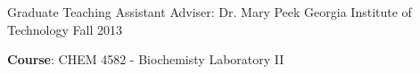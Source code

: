 \begin{cventries}
  \cventry
    {Graduate Teaching Assistant} %
    {Adviser: Dr. Mary Peek} %
    {Georgia Institute of Technology} %
    {Fall 2013} %
    {
      \begin{cvitems} %
        \item {\textbf{Course}: CHEM 4582 - Biochemisty Laboratory II}
      \end{cvitems}
    }

\vspace{-4.0mm}
\end{cventries}
